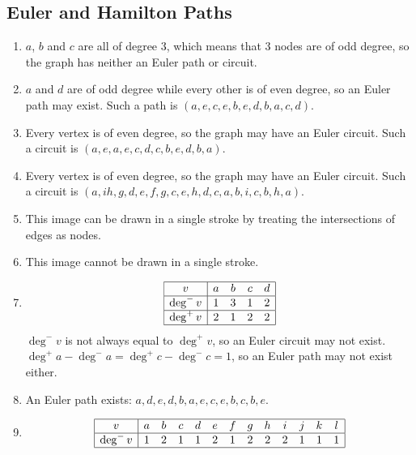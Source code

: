 \documentclass[12pt, A4]{article}
\newcommand{\enumset}[1]{\setcounter{enumi}{#1}}
\begin{document}
		\subsection{Euler and Hamilton Paths}
			\begin{enumerate}
				\item
					\(a\), \(b\) and \(c\) are all of degree 3, which means that 3 nodes are of odd degree, so the graph has neither an Euler path or circuit.
				\enumset{2}
				\item
					\(a\) and \(d\) are of odd degree while every other is of even degree, so an Euler path may exist. Such a path is \((a, e, c, e, b, e, d, b, a, c, d)\).
				\enumset{4}
				\item
					Every vertex is of even degree, so the graph may have an Euler circuit. Such a circuit is \((a, e, a, e, c, d, c, b, e, d, b, a)\).
				\enumset{6}
				\item
					Every vertex is of even degree, so the graph may have an Euler circuit. Such a circuit is \((a, i h, g, d, e, f, g, c, e, h, d, c, a, b, i, c, b, h, a)\).
				\enumset{12}
				\item
					This image can be drawn in a single stroke by treating the intersections of edges as nodes. \\
				\enumset{14}
				\item
					This image cannot be drawn in a single stroke. \\
				\enumset{18}
				\item
					\[\begin{array}{|c|*{4}{c}|}\hline
						v & a & b & c & d \\\hline
						\deg^-v & 1 & 3 & 1 & 2 \\\hline
						\deg^+v & 2 & 1 & 2 & 2 \\\hline
					\end{array}\]
					\(\deg^-v\) is not always equal to \(\deg^+v\), so an Euler circuit may not exist. \(\deg^+a - \deg^-a = \deg^+c - \deg^-c = 1\), so an Euler path may not exist either. \\
				\enumset{20}
				\item
					An Euler path exists: \(a, d, e, d, b, a, e, c, e, b, c, b, e\).
				\enumset{22}
				\item
					\[\begin{array}{|c|*{12}{c}|}\hline
						v & a & b & c & d & e & f & g & h & i & j & k & l \\\hline
						\deg^-v & 1 & 2 & 1 & 1 & 2 & 1 & 2 & 2 & 2 & 1 & 1 & 1 \\\hline

\end{array}\]
\end{enumerate}
\end{document}

